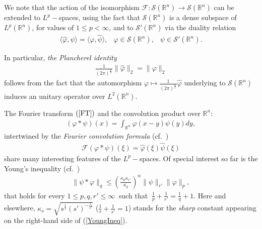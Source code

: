 \documentclass{amsart}
\theoremstyle{definition}
\theoremstyle{remark}
\numberwithin{equation}{section}
\newcommand{\BR}{{\mathbb R}}
\begin{document}
We note that the action of the isomorphism $\mathcal{F}:\mathcal{S}(\BR^n)\longrightarrow \mathcal{S}(\BR^n)$ can be extended to $L^p-$spaces, using the fact that $\mathcal{S}(\BR^n)$ is a dense subspace of $L^p(\BR^n)$, for values of $1\leq p<\infty$, and to $\mathcal{S}'(\BR^n)$ via the duality relation
\begin{eqnarray*}
	\langle \widehat{\varphi},\psi \rangle=\langle \varphi,\widehat{\psi}\rangle, & \varphi\in \mathcal{S}(\BR^n), & \psi\in \mathcal{S}'(\BR^n).
\end{eqnarray*}

In particular, {\it the Plancherel identity}
\begin{eqnarray}
	\label{PlancherelId}
	\displaystyle  \frac{1}{{(2\pi)^{\frac{n}{2}}}}\|  \widehat{\varphi}\|_2 =\| \varphi\|_2
\end{eqnarray}
follows from the fact that the automorphism $\displaystyle \varphi\mapsto \frac{1}{{(2\pi)^{\frac{n}{2}}}}\widehat{\varphi}$ underlying to $\mathcal{S}(\BR^n)$ induces an unitary operator over $L^2(\BR^n)$.

The Fourier transform $(\ref{FT})$ and the convolution product over $\BR^n$:
\begin{eqnarray}
	\label{ConvolutionRn}(\varphi \ast \psi)(x)=\int_{\BR^n} \varphi(x-y) \psi(y)dy,
\end{eqnarray}
intertwined by the {\it Fourier convolution formula} (cf.~\cite[Theorem 5.8]{LiebLoss01})
\begin{eqnarray}
	\label{FourierConvolutionRn} \mathcal{F}(\varphi \ast \psi)(\xi)=\widehat{\varphi}(\xi) \widehat{\psi}(\xi)
\end{eqnarray}
share many interesting features of the $L^p-$spaces. Of special interest so far
is the Young's inequality (cf.~\cite[Theorem 4.2]{LiebLoss01})
\begin{eqnarray}
	\label{YoungIneq}\| \psi \ast \varphi\|_q \leq \left(\frac{\kappa_p\kappa_{r'}}{\kappa_q}\right)^n\|\psi \|_{r'} \| \varphi\|_p,
\end{eqnarray}
that holds for every $1\leq p,q,r'\leq \infty~$ such  that $\displaystyle ~\frac{1}{p}+\frac{1}{r'}=\frac{1}{q}+1.$
Here and elsewhere, $\displaystyle \kappa_s=\sqrt{{s^{\frac{1}{s}}}{(s')^{-\frac{1}{s'}}}}$ ($\displaystyle \frac{1}{s}+\frac{1}{s'}=1$) stands for the {\it sharp} constant appearing on the right-hand side of (\ref{YoungIneq}).
\end{document}
